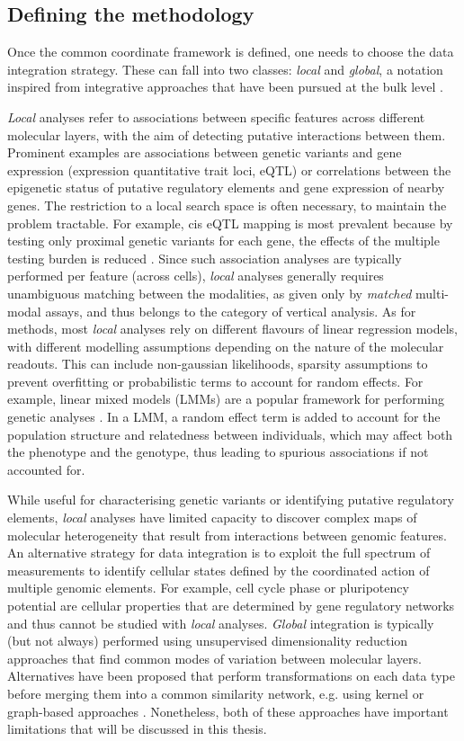 \subsection{Defining the methodology}

Once the common coordinate framework is defined, one needs to choose the data integration strategy. These can fall into two classes: \textit{local} and \textit{global}, a notation inspired from integrative approaches that have been pursued at the bulk level \cite{Ritchie2015}. 

\textit{Local} analyses refer to associations between specific features across different molecular layers, with the aim of detecting putative interactions between them. Prominent examples are associations between genetic variants and gene expression (expression quantitative trait loci, eQTL) or correlations between the epigenetic status of putative regulatory elements and gene expression of nearby genes. The restriction to a local search space is often necessary, to maintain the problem tractable. For example, cis eQTL mapping is most prevalent because by testing only proximal genetic variants for each gene, the effects of the multiple testing burden is reduced \cite{Nica2013}. Since such association analyses are typically performed per feature (across cells), \textit{local} analyses generally requires unambiguous matching between the modalities, as given only by \textit{matched} multi-modal assays, and thus belongs to the category of vertical analysis. As for methods, most \textit{local} analyses rely on different flavours of linear regression models, with different modelling assumptions depending on the nature of the molecular readouts. This can include non-gaussian likelihoods, sparsity assumptions to prevent overfitting or probabilistic terms to account for random effects. For example, linear mixed models (LMMs) are a popular framework for performing genetic analyses \cite{Moore2019}. In a LMM, a random effect term is added to account for the population structure and relatedness between individuals, which may affect both the phenotype and the genotype, thus leading to spurious associations if not accounted for.

While useful for characterising genetic variants or identifying putative regulatory elements, \textit{local} analyses have limited capacity to discover complex maps of molecular heterogeneity that result from interactions between genomic features. An alternative strategy for data integration is to exploit the full spectrum of measurements to identify cellular states defined by the coordinated action of multiple genomic elements. For example, cell cycle phase or pluripotency potential are cellular properties that are determined by gene regulatory networks and thus cannot be studied with \textit{local} analyses. \textit{Global} integration is typically (but not always) performed using unsupervised dimensionality reduction approaches that find common modes of variation between molecular layers. Alternatives have been proposed that perform transformations on each data type before merging them into a common similarity network, e.g. using kernel or graph-based approaches \cite{Lanckriet2004, Wang2014}. Nonetheless, both of these approaches have important limitations that will be discussed in this thesis.

